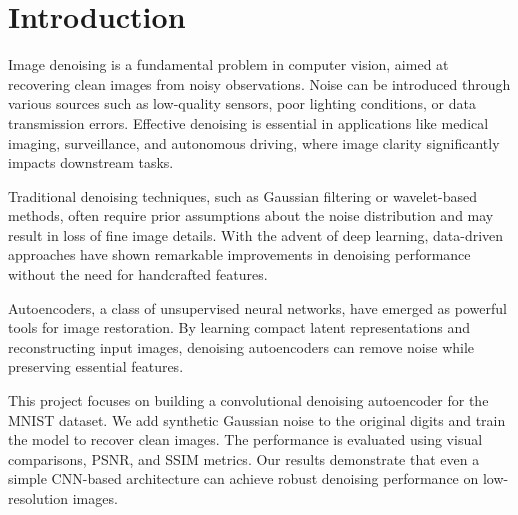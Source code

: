 \section{Introduction}

Image denoising is a fundamental problem in computer vision, aimed at recovering clean images from noisy observations. Noise can be introduced through various sources such as low-quality sensors, poor lighting conditions, or data transmission errors. Effective denoising is essential in applications like medical imaging, surveillance, and autonomous driving, where image clarity significantly impacts downstream tasks.

Traditional denoising techniques, such as Gaussian filtering or wavelet-based methods, often require prior assumptions about the noise distribution and may result in loss of fine image details. With the advent of deep learning, data-driven approaches have shown remarkable improvements in denoising performance without the need for handcrafted features.

Autoencoders, a class of unsupervised neural networks, have emerged as powerful tools for image restoration. By learning compact latent representations and reconstructing input images, denoising autoencoders can remove noise while preserving essential features.

This project focuses on building a convolutional denoising autoencoder for the MNIST dataset. We add synthetic Gaussian noise to the original digits and train the model to recover clean images. The performance is evaluated using visual comparisons, PSNR, and SSIM metrics. Our results demonstrate that even a simple CNN-based architecture can achieve robust denoising performance on low-resolution images.
